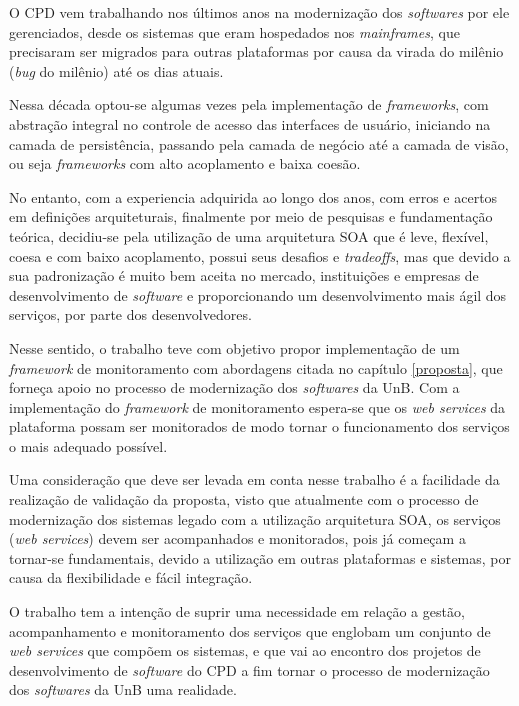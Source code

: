 \label{conclusao}

O \acrshort{CPD} vem trabalhando nos últimos anos na modernização dos \textit{softwares} por ele gerenciados, desde os sistemas que eram hospedados nos \textit{mainframes}, que precisaram ser migrados para outras plataformas por causa da virada do milênio (\textit{bug} do milênio) até os dias atuais. 

Nessa década optou-se algumas vezes pela implementação de \textit{frameworks}, com abstração integral no controle de acesso das interfaces de usuário, iniciando na camada de persistência, passando pela camada de negócio até a camada de visão, ou seja \textit{frameworks} com alto acoplamento e baixa coesão. 

No entanto, com a experiencia adquirida ao longo dos anos, com erros e acertos em definições arquiteturais, finalmente por meio de pesquisas e fundamentação teórica, decidiu-se pela utilização de uma arquitetura \acrshort{SOA} que é leve, flexível, coesa e com baixo acoplamento, possui seus desafios e \textit{tradeoffs}, mas que devido a sua padronização é muito bem aceita no mercado, instituições e empresas de desenvolvimento de \textit{software} e proporcionando um desenvolvimento mais ágil dos serviços, por parte dos desenvolvedores.    

Nesse sentido, o trabalho teve com objetivo propor implementação de um \textit{framework} de monitoramento com abordagens citada no capítulo \ref{proposta}, que forneça apoio no processo de modernização dos \textit{softwares} da UnB.
Com a implementação do \textit{framework} de monitoramento espera-se que os \textit{web services} da plataforma possam ser monitorados de modo tornar o funcionamento dos serviços o mais adequado possível.  

Uma consideração que deve ser levada em conta nesse trabalho é a facilidade da realização de validação da proposta, visto que atualmente com o processo de modernização dos sistemas legado com a utilização arquitetura \acrshort{SOA}, os serviços (\textit{web services}) devem ser acompanhados e monitorados, pois já começam a tornar-se fundamentais, devido a utilização em outras plataformas e sistemas, por causa da flexibilidade e fácil integração. 

O trabalho tem a intenção de suprir uma necessidade em relação a gestão, acompanhamento e monitoramento dos serviços que englobam um conjunto de \textit{web services} que compõem os sistemas, e que vai ao encontro dos projetos de desenvolvimento de \textit{software} do \acrshort{CPD} a fim tornar o processo de modernização dos \textit{softwares} da \acrshort{UnB} uma realidade.


